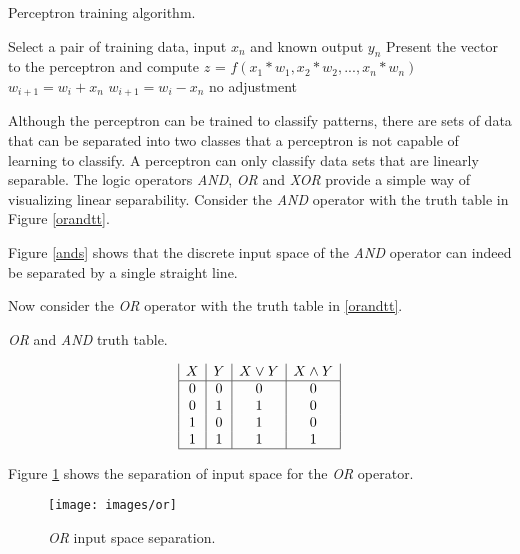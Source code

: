 \begin{algorithm}[htb!]
\caption{Perceptron training algorithm.}
\label{perceptronAlg}    
\begin{algorithmic}

\STATE Select a pair of training data, input $x_n$ and known output $y_n$
\STATE Present the vector to the perceptron and compute $z$ = $f(x_1 * w_1, x_2 * w_2, ..., x_n * w_n)$
\STATE $w_{i+1} = w_i + x_n$
\STATE $w_{i+1} = w_i - x_n$
 \ELSE
\STATE no adjustment
\ENDIF
\ENDWHILE
\end{algorithmic}
\end{algorithm}

Although the perceptron can be trained to classify patterns, there are sets of data that can be separated into two classes that a perceptron is not capable of learning to classify.
A perceptron can only classify data sets that are linearly separable.
The logic operators {\it AND}, {\it OR} and {\it XOR} provide a simple way of visualizing linear separability.
Consider the {\it AND} operator with the truth table in Figure \ref{orandtt}.

Figure \ref{ands} shows that the discrete input space of the {\it AND}
operator can indeed be separated by a single straight line.

Now consider the {\it OR} operator with the truth table in \ref{orandtt}. 

\begin{table}[h!]
\caption{{\it OR} and {\it AND} truth table.}
\label{orandtt}
\begin{displaymath}
\begin{array}{|c|c|c|c|}
   X
 & Y
 & X \lor Y
 & X \land Y

\\
\hline
0 & 0 & 0 & 0\\
0 & 1 & 1 & 0\\
1 & 0 & 1 & 0\\
1 & 1 & 1 & 1\\
\hline
\end{array}
\end{displaymath}
\end{table}

Figure \ref{ors} shows the separation of input space for the {\it OR} operator.

\begin{figure}[htb!]
  \centering
  \texttt{[image: images/or]}
  \caption{{\it OR} input space separation.}
  \label{ors}
\end{figure}

